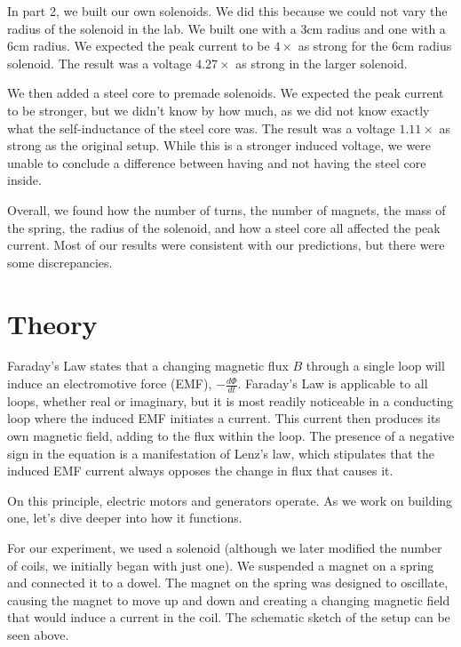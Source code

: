 \documentclass[11pt]{article}
\let\oldsection\section
\renewcommand\section{\clearpage\oldsection}
\begin{document}
    In part 2, we built our own solenoids.
    We did this because we could not vary the radius of the solenoid in the lab.
    We built one with a 3cm radius and one with a 6cm radius.
    We expected the peak current to be $4 \times$ as strong for the 6cm radius solenoid.
    The result was a voltage $4.27 \times$ as strong in the larger solenoid.

    We then added a steel core to premade solenoids.
    We expected the peak current to be stronger, but we didn't know by how much, as we did not know exactly what the self-inductance of the steel core was.
    The result was a voltage $1.11 \times$ as strong as the original setup. While this is a stronger induced voltage, we were unable to conclude a difference between having and not having the steel core inside.

    Overall, we found how the number of turns, the number of magnets, the mass of the spring, the radius of the solenoid, and how a steel core all affected the peak current.
    Most of our results were consistent with our predictions, but there were some discrepancies.

    \section*{Theory}\label{sec:theory}

    Faraday’s Law states that a changing magnetic flux \(B\) through a single loop will induce an electromotive force (EMF), \(-\frac{d\Phi}{dt}\). Faraday’s Law is applicable to all loops, whether real or imaginary, but it is most readily noticeable in a conducting loop where the induced EMF initiates a current. This current then produces its own magnetic field, adding to the flux within the loop. The presence of a negative sign in the equation is a manifestation of Lenz’s law, which stipulates that the induced EMF current always opposes the change in flux that causes it. 
    
    On this principle, electric motors and generators operate. As we work on building one, let's dive deeper into how it functions.
    
    For our experiment, we used a solenoid (although we later modified the number of coils, we initially began with just one). We suspended a magnet on a spring and connected it to a dowel. The magnet on the spring was designed to oscillate, causing the magnet to move up and down and creating a changing magnetic field that would induce a current in the coil. The schematic sketch of the setup can be seen above. 
    
\end{document}
